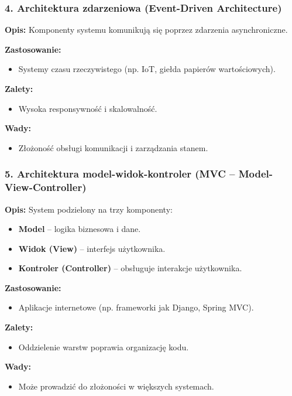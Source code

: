 \subsubsection{4. Architektura zdarzeniowa (Event-Driven Architecture)}
\textbf{Opis:}  
Komponenty systemu komunikują się poprzez zdarzenia asynchroniczne.

\textbf{Zastosowanie:}
\begin{itemize}
    \item Systemy czasu rzeczywistego (np. IoT, giełda papierów wartościowych).
\end{itemize}

\textbf{Zalety:}
\begin{itemize}
    \item Wysoka responsywność i skalowalność.
\end{itemize}

\textbf{Wady:}
\begin{itemize}
    \item Złożoność obsługi komunikacji i zarządzania stanem.
\end{itemize}

\subsubsection{5. Architektura model-widok-kontroler (MVC – Model-View-Controller)}
\textbf{Opis:}  
System podzielony na trzy komponenty:
\begin{itemize}
    \item \textbf{Model} – logika biznesowa i dane.
    \item \textbf{Widok (View)} – interfejs użytkownika.
    \item \textbf{Kontroler (Controller)} – obsługuje interakcje użytkownika.
\end{itemize}

\textbf{Zastosowanie:}
\begin{itemize}
    \item Aplikacje internetowe (np. frameworki jak Django, Spring MVC).
\end{itemize}

\textbf{Zalety:}
\begin{itemize}
    \item Oddzielenie warstw poprawia organizację kodu.
\end{itemize}

\textbf{Wady:}
\begin{itemize}
    \item Może prowadzić do złożoności w większych systemach.
\end{itemize}

